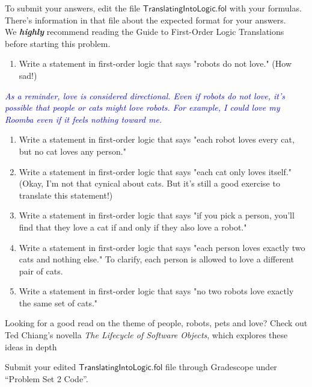 \documentclass{article}
\renewcommand{\(}{\left(}
\renewcommand{\)}{\right)}
\theoremstyle{plain}
\theoremstyle{plain}
\theoremstyle{definition}
\renewcommand{\emph}[1]{\textit{\textbf{#1}}}
\newcommand{\annotate}[1]{\textit{\textcolor{blue}{#1}}}
\begin{document}
To submit your answers, edit the file $\mathsf{TranslatingIntoLogic.fol}$ with your formulas. There's information in that file about the expected format for your answers.\\

We \emph{highly} recommend reading the 
Guide to First-Order Logic Translations before starting this problem.

\begin{enumerate}[label*=\roman*.,ref=\roman*]
    \item Write a statement in first-order logic that says "robots do not love." (How sad!)

\end{enumerate}

\annotate{As a reminder, love is considered directional. Even if robots do not love, it's possible that people or cats might love robots. For example, I could love my Roomba even if it feels nothing toward me. \smiley{}}

\begin{enumerate}[resume*]

    \item Write a statement in first-order logic that says "each robot loves every cat, but no cat loves any person."
    \item Write a statement in first-order logic that says "each cat only loves itself." (Okay, I'm not that cynical about cats. But it's still a good exercise to translate this statement!)
    \item Write a statement in first-order logic that says "if you pick a person, you'll find that they love a cat if and only if they also love a robot."
    \item Write a statement in first-order logic that says "each person loves exactly two cats and nothing else." To clarify, each person is allowed to love a different pair of cats.
    \item Write a statement in first-order logic that says "no two robots love exactly the same set of cats."

\end{enumerate}

Looking for a good read on the theme of people, robots, pets and love? Check out Ted Chiang's novella \textit{The Lifecycle of Software Objects}, which explores these ideas in depth \smiley{}

\begin{shaded}
  Submit your edited $\mathsf{TranslatingIntoLogic.fol}$ file
  through Gradescope under ``Problem Set 2 Code''.
\end{shaded}
\end{document}
